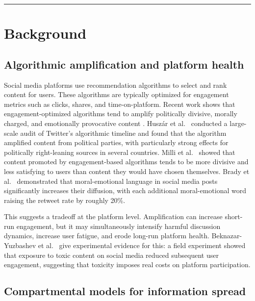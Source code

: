 \documentclass[11pt]{article}
\begin{document}
\noindent\rule{\linewidth}{0.4pt}

\newpage
\tableofcontents
\newpage

\section{Background}
\label{sec:background}

\subsection{Algorithmic amplification and platform health}

Social media platforms use recommendation algorithms to select and rank content for users. These algorithms are typically optimized for engagement metrics such as clicks, shares, and time-on-platform. Recent work shows that engagement-optimized algorithms tend to amplify politically divisive, morally charged, and emotionally provocative content \cite{huszar2022, milli2025, brady2017}. Husz\'{a}r et al.\ \cite{huszar2022} conducted a large-scale audit of Twitter's algorithmic timeline and found that the algorithm amplified content from political parties, with particularly strong effects for politically right-leaning sources in several countries. Milli et al.\ \cite{milli2025} showed that content promoted by engagement-based algorithms tends to be more divisive and less satisfying to users than content they would have chosen themselves. Brady et al.\ \cite{brady2017} demonstrated that moral-emotional language in social media posts significantly increases their diffusion, with each additional moral-emotional word raising the retweet rate by roughly 20\%.

This suggests a tradeoff at the platform level. Amplification can increase short-run engagement, but it may simultaneously intensify harmful discussion dynamics, increase user fatigue, and erode long-run platform health. Beknazar-Yuzbashev et al.\ \cite{beknazar2025} give experimental evidence for this: a field experiment showed that exposure to toxic content on social media reduced subsequent user engagement, suggesting that toxicity imposes real costs on platform participation.

\subsection{Compartmental models for information spread}
\end{document}
